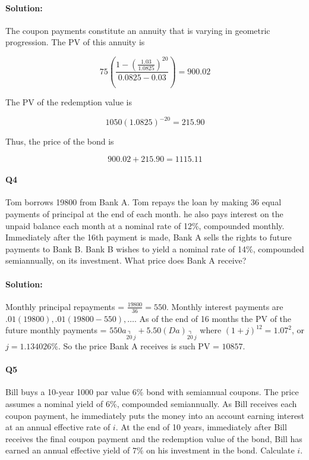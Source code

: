 \documentclass[a4paper, 11pt, twoside]{article}
\begin{document}
\paragraph{Solution:} The coupon payments constitute an annuity that  is varying in geometric progression. The PV of this annuity is

\[75\left(\frac{1-\left(\frac{1.03}{1.0825}\right)^{20}}{0.0825-0.03}\right)=900.02\]

The PV of the redemption value is

\[1050(1.0825)^{-20}=215.90\]

Thus, the price of the bond is

\[900.02+215.90=1115.11\]

\paragraph{Q4} Tom borrows 19800 from Bank A. Tom repays the loan by making 36 equal payments of principal at the end of each month. he also pays interest on the unpaid balance each month at a nominal rate of 12\%, compounded monthly. Immediately after the 16th payment is made, Bank A sells the rights to future payments to Bank B. Bank B wishes to yield a nominal rate of 14\%, compounded semiannually, on its investment. What price does Bank A receive?

\paragraph{Solution:} Monthly principal repayments = $\frac{19800}{36}=550.$ Monthly interest payments are $.01(19800), .01(19800-550),\dots$. As of the end of 16 months the PV of the future monthly payments = $550a_{\annuity{20\ }j} + 5.50(Da)_{\annuity{20\ }j}$ where $(1+j)^{12} = 1.07^2$, or $j=1.134026\%$. So the price Bank A receives is such PV = $10857$.

\paragraph{Q5} Bill buys a 10-year 1000 par value 6\% bond with semiannual coupons. The price assumes a nominal yield of 6\%, compounded semiannually. As Bill receives each coupon payment, he immediately puts the money into an account earning interest at an annual effective rate of $i$. At the end of 10 years, immediately after Bill receives the final coupon payment and the redemption value of the bond, Bill has earned an annual effective yield of $7\%$ on his investment in the bond. Calculate $i$. 
\end{document}
